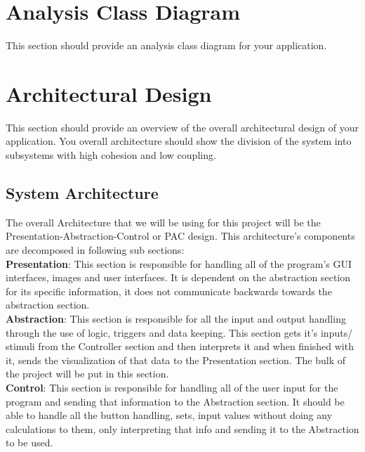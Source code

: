 \documentclass[]{article}
\begin{document}


\section{Analysis Class Diagram}
\label{sec:analysis_class_diagram}
This section should provide an analysis class diagram for your application.

\section{Architectural Design}
\label{sec:architectural_design}
This section should provide an overview of the overall architectural design of
your application. You overall architecture should show the division of the system
into subsystems with high cohesion and low coupling.

\subsection{System Architecture}
\label{sub:system_architecture}

The overall Architecture that we will be using for this project will be the 
Presentation-Abstraction-Control or PAC design. This architecture’s components 
are decomposed in following sub sections: \\

\textbf{Presentation}: This section is responsible for handling all of the program’s
GUI interfaces, images and user interfaces. It is dependent on the abstraction section
for its specific information, it does not communicate backwards towards the abstraction section. \\

\textbf{Abstraction}: This section is responsible for all the input and output
handling through the use of logic, triggers and data keeping. This section gets it’s
inputs/ stimuli from the Controller section and then interprets it and when finished
with it, sends the visualization of that data to the Presentation section. The bulk
of the project will be put in this section. \\

\textbf{Control}: This section is responsible for handling all of the user input
for the program and sending that information to the Abstraction section. It should
be able to handle all the button handling, sets, input values without doing any
calculations to them, only interpreting that info and sending it to the Abstraction to be used. \\
\end{document}

